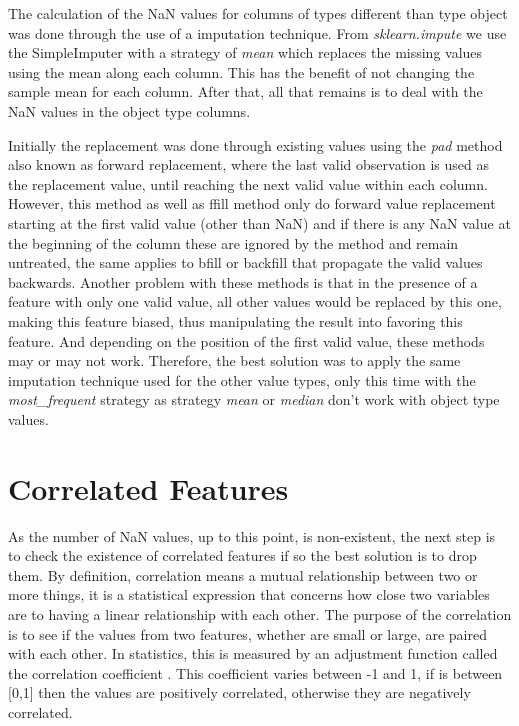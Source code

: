 The calculation of the NaN values for columns of types different than type object was done through the use of a imputation technique. From \textit{sklearn.impute} we use the SimpleImputer with a strategy of \textit{mean} which replaces the missing values using the mean along each column. This has the benefit of not changing the sample mean for each column. After that, all that remains is to deal with the NaN values in the object type columns.

Initially the replacement was done through existing values using the \textit{pad} method also known as forward replacement, where the last valid observation is used as the replacement value, until reaching the next valid value within each column. However, this method as well as ffill method only do forward value replacement starting at the first valid value (other than NaN) and if there is any NaN value at the beginning of the column these are ignored by the method and remain untreated, the same applies to bfill or backfill that propagate the valid values backwards. Another problem with these methods is that in the presence of a feature with only one valid value, all other values would be replaced by this one, making this feature biased, thus manipulating the result into favoring this feature. And depending on the position of the first valid value, these methods may or may not work. Therefore, the best solution was to apply the same imputation technique used for the other value types, only this time with the \textit{most\_frequent} strategy as strategy \textit{mean} or \textit{median} don't work with object type values.

\section{Correlated Features}
\label{sec:correlated_features}
\hspace{10px}As the number of NaN values, up to this point, is non-existent, the next step is to check the existence of correlated features if so the best solution is to drop them. By definition, correlation means a mutual relationship between two or more things, it is a statistical expression that concerns how close two variables are to having a linear relationship with each other\cite{Vishal}. The purpose of the correlation is to see if the values from two features, whether are small or large, are paired with each other. In statistics, this is measured by an adjustment function called the correlation coefficient \cite{corrwebsite}. This coefficient varies between -1 and 1, if is between [0,1] then the values are positively correlated, otherwise they are negatively correlated.

